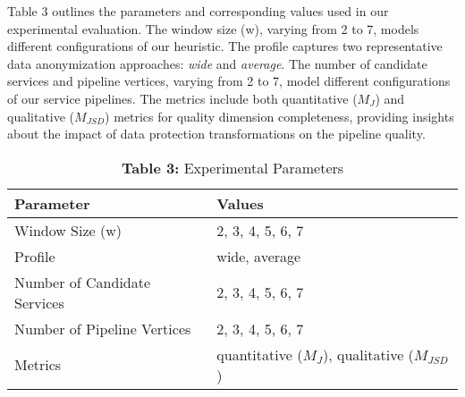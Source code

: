 {\begin{adjustwidth}{10pt}{10pt}
    {\color{OurColor}
   Table 3 outlines the parameters and corresponding values used in our experimental evaluation. The window size (\textbar{}w\textbar{}), varying from 2 to 7, models different configurations of our heuristic. The profile captures two representative data anonymization approaches: \textit{wide} and \textit{average}. The number of candidate services and pipeline vertices, varying from 2 to 7, model different configurations of our service pipelines. The metrics include both quantitative ($M_J$) and qualitative ($M_{JSD}$) metrics for quality dimension completeness, providing insights about the impact of data protection transformations on the pipeline quality.}
    \end{adjustwidth}
     \begin{table}[h!]
      \caption*{\textbf{Table 3:} Experimental Parameters}
      \label{tab:parameters}
      \centering
      {\color{OurColor}
        \begin{tabular}{l|l}
          \textbf{Parameter}                  & \textbf{Values}  \\
          \hline
          Window Size (\textbar{}w\textbar{}) & 2, 3, 4, 5, 6, 7 \\
          Profile                             & wide, average    \\
          Number of Candidate Services        & 2, 3, 4, 5, 6, 7 \\
          Number of Pipeline Vertices            & 2, 3, 4, 5, 6, 7 \\
          Metrics                             & quantitative ($M_J$), qualitative ($M_{JSD}$) \\
        \end{tabular}
      }
    \end{table}
~}




\answer{}


